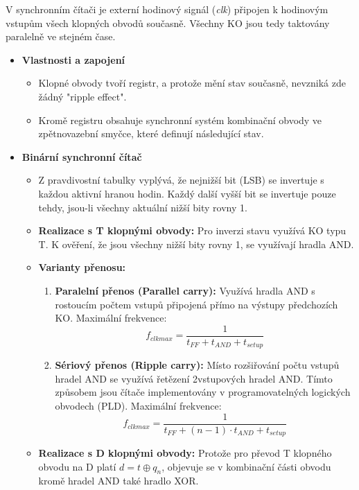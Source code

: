         V synchronním čítači je externí hodinový signál (\textit{clk}) připojen k hodinovým vstupům všech klopných obvodů současně. Všechny KO jsou tedy taktovány paralelně ve stejném čase.
        
        \begin{itemize}
            \item \textbf{Vlastnosti a zapojení}
            \begin{itemize}
                \item Klopné obvody tvoří registr, a protože mění stav současně, nevzniká zde žádný "ripple effect".
                \item Kromě registru obsahuje synchronní systém kombinační obvody ve zpětnovazební smyčce, které definují následující stav.
            \end{itemize}
        
            \item \textbf{Binární synchronní čítač}
            \begin{itemize}
                \item Z pravdivostní tabulky vyplývá, že nejnižší bit (LSB) se invertuje s každou aktivní hranou hodin. Každý další vyšší bit se invertuje pouze tehdy, jsou-li všechny aktuální nižší bity rovny 1.
                \item \textbf{Realizace s T klopnými obvody:} Pro inverzi stavu využívá KO typu T. K ověření, že jsou všechny nižší bity rovny 1, se využívají hradla AND.
                \item \textbf{Varianty přenosu:}
                \begin{enumerate}
                    \item \textbf{Paralelní přenos (Parallel carry):} Využívá hradla AND s rostoucím počtem vstupů připojená přímo na výstupy předchozích KO. Maximální frekvence: $$f_{clkmax} = \frac{1}{t_{FF} + t_{AND} + t_{setup}}$$
                    \item \textbf{Sériový přenos (Ripple carry):} Místo rozšiřování počtu vstupů hradel AND se využívá řetězení 2vstupových hradel AND. Tímto způsobem jsou čítače implementovány v programovatelných logických obvodech (PLD). Maximální frekvence: $$f_{clkmax} = \frac{1}{t_{FF} + (n-1) \cdot t_{AND} + t_{setup}}$$
                \end{enumerate}
                \item \textbf{Realizace s D klopnými obvody:} Protože pro převod T klopného obvodu na D platí $d = t \oplus q_n$, objevuje se v kombinační části obvodu kromě hradel AND také hradlo XOR.
            \end{itemize}
        

\end{itemize}
